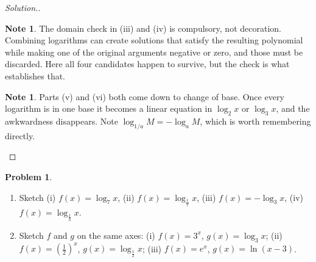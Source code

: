 \documentclass[11pt,a4paper]{article}
\theoremstyle{definition}
\newtheorem{note}[thm]{Note}
\newtheorem{problemx}{Problem}[section]
\newenvironment{problem}{\begin{problemx}}{\end{problemx}}
\newenvironment{solution}
  {\renewcommand{\qedsymbol}{}\begin{proof}[\textit{Solution}.]}
  {\end{proof}}
\begin{document}
\begin{solution}
\begin{note}
The domain check in (iii) and (iv) is compulsory, not decoration. Combining logarithms
can create solutions that satisfy the resulting polynomial while making one of the
original arguments negative or zero, and those must be discarded. Here all four
candidates happen to survive, but the check is what establishes that.
\end{note}

\begin{note}
Parts (v) and (vi) both come down to change of base. Once every logarithm is in one
base it becomes a linear equation in $\log_2 x$ or $\log_3 x$, and the awkwardness
disappears. Note $\log_{1/a}M=-\log_a M$, which is worth remembering directly.
\end{note}
\end{solution}

\begin{problem}
\begin{enumerate}
\item[(a).] Sketch \quad (i) $f(x)=\log_7 x$, \quad (ii) $f(x)=\log_{\frac{1}{7}}x$,
\quad (iii) $f(x)=-\log_3 x$, \quad (iv) $f(x)=\log_{\frac{1}{3}}x$.
\item[(b).] Sketch $f$ and $g$ on the same axes:
\quad (i) $f(x)=3^x$, $g(x)=\log_3 x$; \quad
(ii) $f(x)=\left(\frac{1}{2}\right)^x$, $g(x)=\log_{\frac{1}{2}}x$; \quad
(iii) $f(x)=e^x$, $g(x)=\ln(x-3)$.
\end{enumerate}
\end{problem}
\end{document}
